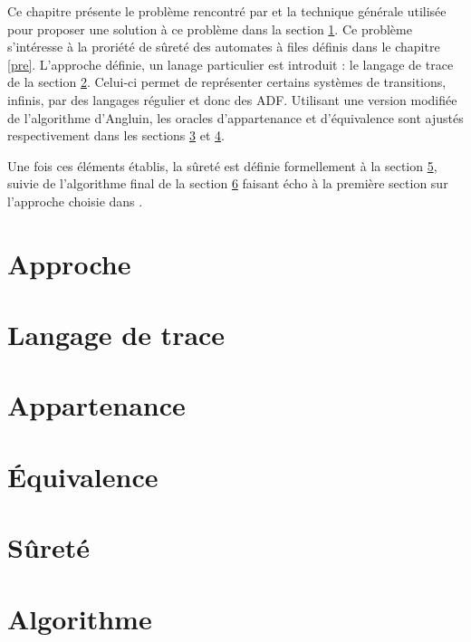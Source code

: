 Ce chapitre présente le problème rencontré par \cite{Vardhan04} et la technique générale utilisée pour proposer une solution à ce problème dans la section \ref{app}. Ce problème s'intéresse à la proriété de sûreté des automates à files définis dans le chapitre \ref{pre}. L'approche définie, un lanage particulier est introduit : le langage de trace de la section \ref{trace}. Celui-ci permet de représenter certains systèmes de transitions, infinis, par des langages régulier et donc des ADF. Utilisant une version modifiée de l'algorithme d'Angluin, les oracles d'appartenance et d'équivalence sont ajustés respectivement dans les sections \ref{mem} et \ref{eq}.

Une fois ces éléments établis, la sûreté est définie formellement à la section \ref{safety}, suivie de l'algorithme final de la section \ref{lever} faisant écho à la première section sur l'approche choisie dans \cite{Vardhan04}.


\section{Approche}\label{app}
\section{Langage de trace}\label{trace}
\section{Appartenance}\label{mem}
\section{Équivalence}\label{eq}
\section{Sûreté}\label{safety}
\section{Algorithme}\label{lever}
